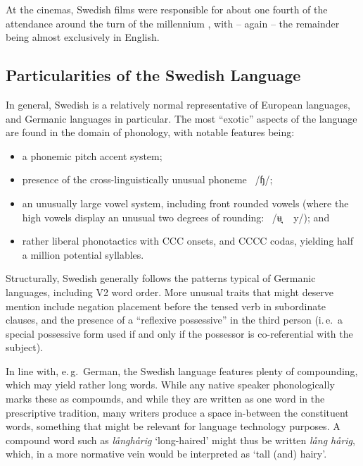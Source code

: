 \begin{multicols}{2}
At the cinemas, Swedish films were responsible for about one fourth of
the attendance around the turn of the millennium \cite[85]{falk2001},
with -- again -- the remainder being almost exclusively in English.


\subsection{Particularities of the Swedish Language}

In general, Swedish is a relatively normal representative of European
languages, and Germanic languages in particular. The most ``exotic''
aspects of the language are found in the domain of phonology, with
notable features being:

\begin{itemize}    
\item a phonemic pitch accent system;
\item presence of the cross-linguistically unusual
  phoneme~{ /ɧ/};
\item an unusually large vowel system, including front rounded vowels
  (where the high vowels display an unusual two degrees of
  rounding:~{ /ʉ̘ ~
    y/}); and
\item rather liberal phonotactics with CCC onsets, and CCCC codas, yielding half a million potential syllables.
\end{itemize}

Structurally, Swedish generally follows the patterns typical of
Germanic languages, including V2 word order. More unusual traits that
might deserve mention include negation placement before the tensed
verb in subordinate clauses, and the presence of a ``reflexive
possessive'' in the third person (i.\,e.~a special possessive form used
if and only if the possessor is co-referential with the subject).


In line with, e.\,g.~German, the Swedish language features plenty of
compounding, which may yield rather long words. While any native
speaker phonologically marks these as compounds, and while they are
written as one word in the prescriptive tradition, many writers
produce a space in-between the constituent words, something that might
be relevant for language technology purposes. A compound word such as
\textit{långhårig} `long-haired' might thus be written \textit{lång
  hårig}, which, in a more normative vein would be interpreted as
`tall (and) hairy'.


\end{multicols}
